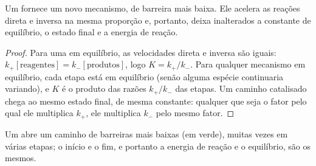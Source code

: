 \begin{proposition}\label{prop:b1:elementary-steps:catalysis}
Um  fornece um novo mecanismo, de barreira mais baixa. Ele
acelera as reações direta e inversa na mesma proporção e, portanto,
deixa inalterados a constante de equilíbrio, o estado final e a energia
de reação.
\end{proposition}

\begin{proof}
Para uma  em equilíbrio, as velocidades direta e inversa
são iguais: $k_+[\text{reagentes}] = k_-[\text{produtos}]$, logo $K = k_+/k_-$.
Para qualquer mecanismo em equilíbrio, cada etapa está em equilíbrio
(senão alguma espécie continuaria variando), e $K$ é o produto das
razões $k_+/k_-$ das etapas. Um caminho catalisado chega ao mesmo estado
final, de mesma constante: qualquer que seja o fator pelo qual ele
multiplica $k_+$, ele multiplica $k_-$ pelo mesmo fator.
\end{proof}

\begin{omfigure}

{\small Um  abre um caminho de barreiras mais baixas (em
verde), muitas vezes em várias etapas; o início e o fim, e portanto a
energia de reação e o equilíbrio, são os mesmos.}
\end{omfigure}

